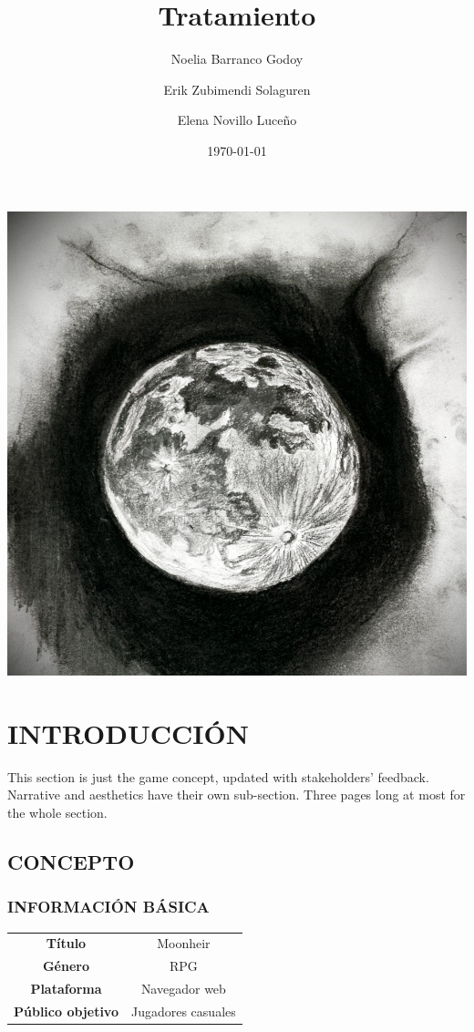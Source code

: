\documentclass{article}
\title{Tratamiento} %
\author{Noelia Barranco Godoy
\and Erik Zubimendi Solaguren\and
Elena Novillo Luceño}
\date{\today} %
\begin{document}
    \begin{titlepage}
        \maketitle
        \thispagestyle{empty}
        \begin{center}
            \includegraphics[scale=0.125]{moon.jpg}
        \end{center} 
    \end{titlepage}
        
    \tableofcontents
    \newpage
    
    \section{INTRODUCCIÓN}
    This section is just the game concept, updated with stakeholders’ feedback. Narrative and aesthetics have their own sub-section. Three pages long at most for the whole section.

    \subsection{CONCEPTO}
    \subsubsection{INFORMACIÓN BÁSICA}
    \begin{tabular}{||c|c||}
        \hline
        \textbf{Título} & Moonheir \\
        \textbf{Género} & RPG\\
        \textbf{Plataforma} & Navegador web\\
        \textbf{Público objetivo} & Jugadores casuales\\
        \hline
    \end{tabular}
\end{document}
